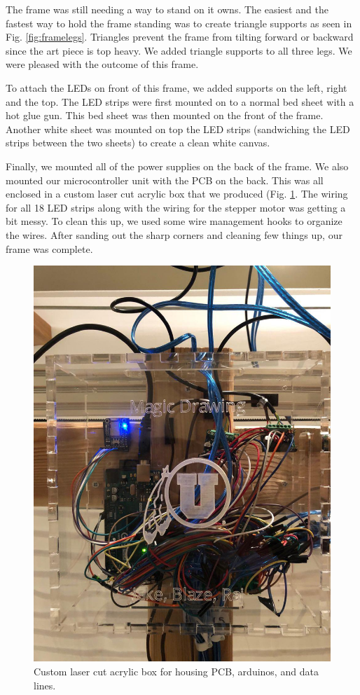 \documentclass[11pt]{IEEEtran}
\begin{document}
The frame was still needing a way to stand on it owns. The easiest and the fastest way to hold the frame standing was to create triangle supports as seen in Fig. \ref{fig:framelegs}. Triangles prevent the frame from tilting forward or backward since the art piece is top heavy. We added triangle supports to all three legs. We were pleased with the outcome of this frame.

To attach the LEDs on front of this frame, we added supports on the left, right and the top. The LED strips were first mounted on to a normal bed sheet with a hot glue gun. This bed sheet was then mounted on the front of the frame. Another white sheet was mounted on top the LED strips (sandwiching the LED strips between the two sheets) to create a clean white canvas.

Finally, we mounted all of the power supplies on the back of the frame. We also mounted our microcontroller unit with the PCB on the back. This was all enclosed in a custom laser cut acrylic box that we produced (Fig. \ref{fig:microbox}. The wiring for all 18 LED strips along with the wiring for the stepper motor was getting a bit messy. To clean this up, we used some wire management hooks to organize the wires. After sanding out the sharp corners and cleaning few things up, our frame was complete.

\begin{figure}
  \centering
  \includegraphics[width=\columnwidth]{microbox.jpg}
  \caption{Custom laser cut acrylic box for housing PCB, arduinos, and data lines.}
  \label{fig:microbox}
\end{figure}
\end{document}
